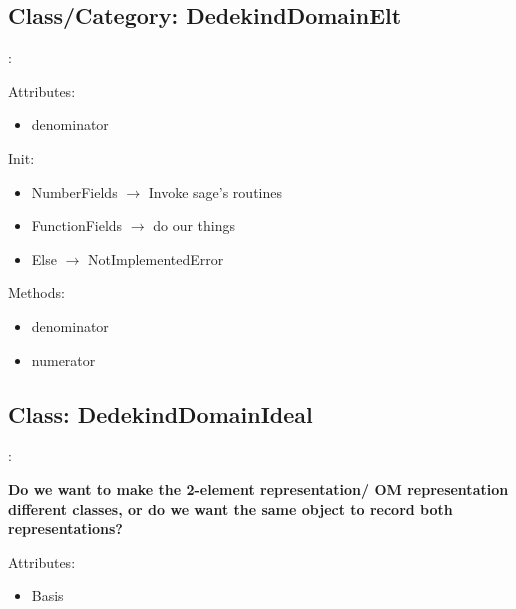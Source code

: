 \documentclass{amsart}
\theoremstyle{definition}
\begin{document}
	\subsection{Class/Category: DedekindDomainElt}: \newline
	
	Attributes:
	\begin{itemize}
		\item 
		denominator
	\end{itemize}
	
	Init:
	\begin{itemize}
		\item
		NumberFields $\rightarrow$ Invoke sage's routines
		\item
		FunctionFields $\rightarrow$ do our things
		\item
		Else $\rightarrow$ NotImplementedError
	\end{itemize}
	
	Methods:
	\begin{itemize}
		\item
		denominator
		\item
		numerator
	\end{itemize}

	\subsection{Class: DedekindDomainIdeal}: \newline
	
	{\bf Do we want to make the 2-element representation/ OM representation different classes, or do we want the same object to record both representations?} \newline
	
	Attributes:
	\begin{itemize}
		\item 
		Basis
	\end{itemize}
	
\end{document}
